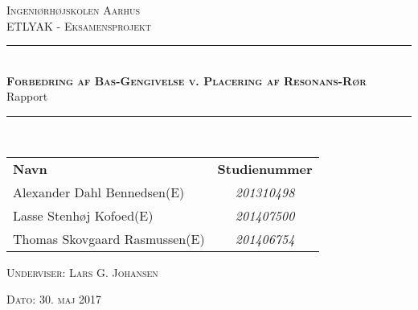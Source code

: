 \newcommand{\HRule}{\rule{\linewidth}{0.1mm}} %

\thispagestyle{empty}
\begin{center}
	\textsc{\LARGE Ingeniørhøjskolen Aarhus}\\[1.5cm] %

	
	\textsc{\large ETLYAK - Eksamensprojekt}\\[2.5cm] 
	\HRule \\[0.8cm]
	{\huge \bfseries \textsc{Forbedring af Bas-Gengivelse v. Placering af Resonans-Rør}} \\[0.5cm]{\LARGE Rapport} \\[0.4cm]
	\HRule \\[1.5cm]
	
	\vspace{0.5 in}
	\begin{center}
		\begin{tabular}{l c}
			\textbf{Navn} & \textbf{Studienummer} \\
			Alexander Dahl Bennedsen(E) & \textsl{201310498}    \\
			Lasse Stenhøj Kofoed(E) & \textsl{201407500}  \\
			Thomas Skovgaard Rasmussen(E) & \textsl{201406754}
			
			
		\end{tabular}
	\end{center}
	\vspace{0.5 in}
	
	\textsc{\large Underviser: Lars G. Johansen}
	\vspace{0.5 in}
	
	\textsc{\large Dato: 30. maj 2017}\\
	
\end{center} %

\newpage